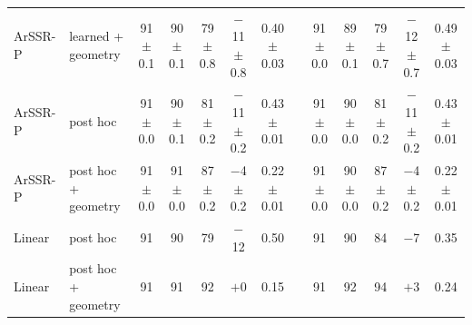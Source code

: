 \begin{table}[t]
\begin{tabular*}{\textwidth}{@{\extracolsep{\fill}}ll ccccc c ccccc@{}}
ArSSR-P & learned + geometry & 91{\tiny$\pm$0.1} & 90{\tiny$\pm$0.1} & 79{\tiny$\pm$0.8} & $-$11{\tiny$\pm$0.8} & 0.40{\tiny$\pm$0.03} &  & 91{\tiny$\pm$0.0} & 89{\tiny$\pm$0.1} & 79{\tiny$\pm$0.7} & $-$12{\tiny$\pm$0.7} & 0.49{\tiny$\pm$0.03} \\
ArSSR-P & post hoc & 91{\tiny$\pm$0.0} & 90{\tiny$\pm$0.1} & 81{\tiny$\pm$0.2} & $-$11{\tiny$\pm$0.2} & 0.43{\tiny$\pm$0.01} &  & 91{\tiny$\pm$0.0} & 90{\tiny$\pm$0.0} & 81{\tiny$\pm$0.2} & $-$11{\tiny$\pm$0.2} & 0.43{\tiny$\pm$0.01} \\
ArSSR-P & post hoc + geometry & 91{\tiny$\pm$0.0} & 91{\tiny$\pm$0.0} & 87{\tiny$\pm$0.2} & $-$4{\tiny$\pm$0.2} & 0.22{\tiny$\pm$0.01} &  & 91{\tiny$\pm$0.0} & 90{\tiny$\pm$0.0} & 87{\tiny$\pm$0.2} & $-$4{\tiny$\pm$0.2} & 0.22{\tiny$\pm$0.01} \\
\addlinespace[2pt]
Linear & post hoc & 91 & 90 & 79 & $-$12 & 0.50 &  & 91 & 90 & 84 & $-$7 & 0.35 \\
Linear & post hoc + geometry & 91 & 91 & 92 & $+$0 & 0.15 &  & 91 & 92 & 94 & $+$3 & 0.24 \\
\bottomrule
\end{tabular*}
\end{table}
